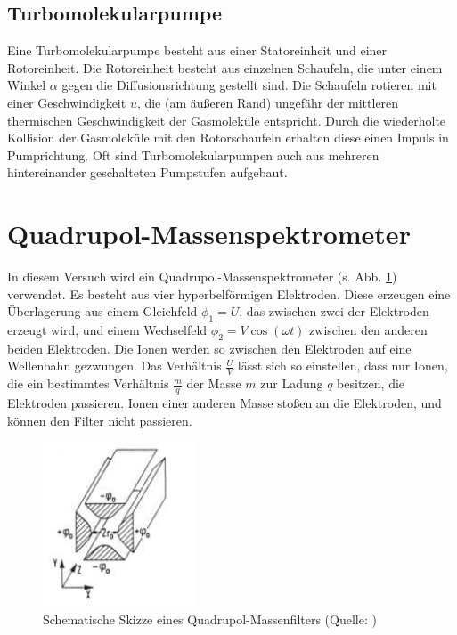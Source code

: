 \subsection{Turbomolekularpumpe}

Eine Turbomolekularpumpe besteht aus einer Statoreinheit und einer Rotoreinheit. Die Rotoreinheit besteht aus einzelnen Schaufeln, die unter einem Winkel $\alpha$ gegen die Diffusionsrichtung gestellt sind.
Die Schaufeln rotieren mit einer Geschwindigkeit $u$, die (am äußeren Rand) ungefähr der mittleren thermischen Geschwindigkeit der Gasmoleküle entspricht. Durch die wiederholte Kollision der Gasmoleküle mit den Rotorschaufeln erhalten diese einen Impuls in Pumprichtung.
Oft sind Turbomolekularpumpen auch aus mehreren hintereinander geschalteten Pumpstufen aufgebaut.

\section{Quadrupol-Massenspektrometer}

In diesem Versuch wird ein Quadrupol-Massenspektrometer (s. Abb. \ref{fig021}) verwendet. Es besteht aus vier hyperbelförmigen Elektroden. Diese erzeugen eine Überlagerung aus einem Gleichfeld $\phi_{1}=U$, das zwischen zwei der Elektroden erzeugt wird, und einem Wechselfeld $\phi_{2}=V\cos(\omega t)$ zwischen den anderen beiden Elektroden.
Die Ionen werden so zwischen den Elektroden auf eine Wellenbahn gezwungen. Das Verhältnis $\frac{U}{V}$ lässt sich so einstellen, dass nur Ionen, die ein bestimmtes Verhältnis $\frac{m}{q}$ der Masse $m$ zur Ladung $q$ besitzen, die Elektroden passieren. Ionen einer anderen Masse stoßen an die Elektroden, und können den Filter nicht passieren.

\begin{figure}[tb]
 \centering
 \includegraphics[scale=0.9]{./fig/massenspek_quadrupol.png}
 \caption{Schematische Skizze eines Quadrupol-Massenfilters (Quelle: \cite[S. 25]{Litmap})}
 \label{fig021}
\end{figure}

